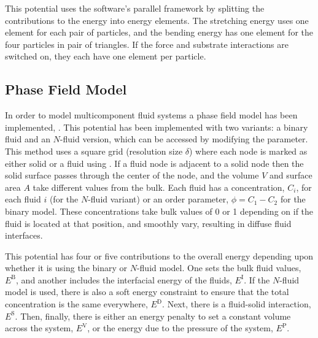 This potential uses the software's parallel framework by splitting the contributions to the energy into energy elements.
The stretching energy uses one element for each pair of particles, and the bending energy has one element for the four particles in pair of triangles.
If the force and substrate interactions are switched on, they each have one element per particle.


\subsection{Phase Field Model}
In order to model multicomponent fluid systems a phase field model has been implemented, .
This potential has been implemented with two variants: a binary fluid and an $N$-fluid version, which can be accessed by modifying the  parameter.
This method uses a square grid (resolution size $\delta$) where each node is marked as either solid or a fluid using .
If a fluid node is adjacent to a solid node then the solid surface passes through the center of the node, and the volume $V$ and surface area $A$ take different values from the bulk.
Each fluid has a concentration, $C_i$, for each fluid $i$ (for the $N$-fluid variant) or an order parameter, $\phi = C_1 - C_2$ for the binary model.
These concentrations take bulk values of 0 or 1 depending on if the fluid is located at that position, and smoothly vary, resulting in diffuse fluid interfaces.

This potential has four or five contributions to the overall energy depending upon whether it is using the binary or $N$-fluid model.
One sets the bulk fluid values, $E^\text{B}$, and another includes the interfacial energy of the fluids, $E^\text{I}$.
If the $N$-fluid model is used, there is also a soft energy constraint to ensure that the total concentration is the same everywhere, $E^\text{D}$.
Next, there is a fluid-solid interaction, $E^\text{S}$.
Then, finally, there is either an energy penalty to set a constant volume across the system, $E^\text{V}$, or the energy due to the pressure of the system, $E^\text{P}$.

